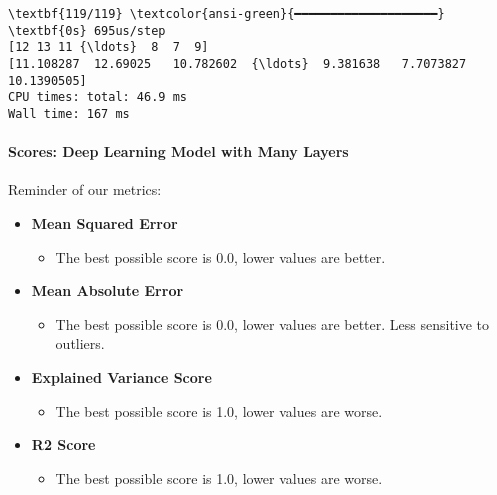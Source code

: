 \documentclass[11pt]{article}
\providecommand{\tightlist}{%
      \setlength{\itemsep}{0pt}\setlength{\parskip}{0pt}}
\begin{document}
    \begin{Verbatim}[commandchars=\\\{\}]
\textbf{119/119} \textcolor{ansi-green}{━━━━━━━━━━━━━━━━━━━━} \textbf{0s} 695us/step
[12 13 11 {\ldots}  8  7  9]
[11.108287  12.69025   10.782602  {\ldots}  9.381638   7.7073827 10.1390505]
CPU times: total: 46.9 ms
Wall time: 167 ms
    \end{Verbatim}

    \paragraph{Scores: Deep Learning Model with Many
Layers}\label{scores-deep-learning-model-with-many-layers}

Reminder of our metrics:

\begin{itemize}
\tightlist
\item
  \textbf{Mean Squared Error}

  \begin{itemize}
  \tightlist
  \item
    The best possible score is 0.0, lower values are better.
  \end{itemize}
\item
  \textbf{Mean Absolute Error}

  \begin{itemize}
  \tightlist
  \item
    The best possible score is 0.0, lower values are better. Less
    sensitive to outliers.
  \end{itemize}
\item
  \textbf{Explained Variance Score}

  \begin{itemize}
  \tightlist
  \item
    The best possible score is 1.0, lower values are worse.
  \end{itemize}
\item
  \textbf{R2 Score}

  \begin{itemize}
  \tightlist
  \item
    The best possible score is 1.0, lower values are worse.
  \end{itemize}
\end{itemize}
\end{document}
